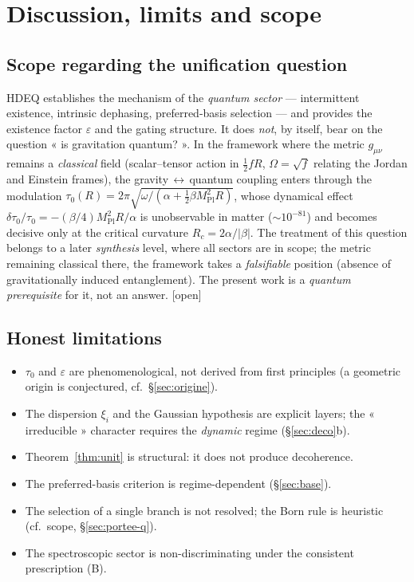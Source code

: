 \documentclass[11pt,a4paper]{article}
\newcommand{\statut}[1]{{\footnotesize\textsf{[#1]}}}
\theoremstyle{plain}
\theoremstyle{definition}
\theoremstyle{remark}
\begin{document}
\section{Discussion, limits and scope}
\subsection{Scope regarding the unification question}
HDEQ establishes the mechanism of the \emph{quantum sector} --- intermittent
existence, intrinsic dephasing, preferred-basis selection --- and provides the
existence factor $\varepsilon$ and the gating structure. It does \emph{not}, by
itself, bear on the question « is gravitation quantum? ». In the framework where
the metric $g_{\mu\nu}$ remains a \emph{classical} field (scalar--tensor action in
$\tfrac12 fR$, $\Omega=\sqrt f$ relating the Jordan and Einstein frames), the
gravity$\,\leftrightarrow\,$quantum coupling enters through the modulation
$\tau_0(R)=2\pi\sqrt{\omega/(\alpha+\tfrac12\beta M_{\mathrm{Pl}}^2 R)}$, whose
dynamical effect $\delta\tau_0/\tau_0=-(\beta/4)M_{\mathrm{Pl}}^2 R/\alpha$ is
unobservable in matter ($\sim10^{-81}$) and becomes decisive only at the critical
curvature $R_c=2\alpha/|\beta|$. The treatment of this question belongs to a later
\emph{synthesis} level, where all sectors are in scope; the metric remaining
classical there, the framework takes a \emph{falsifiable} position (absence of
gravitationally induced entanglement). The present work is a \emph{quantum
prerequisite} for it, not an answer. \statut{open}

\subsection{Honest limitations}
\begin{itemize}
\item $\tau_0$ and $\varepsilon$ are phenomenological, not derived from first principles (a geometric origin is conjectured, cf.\ \S\ref{sec:origine}).
\item The dispersion $\xi_i$ and the Gaussian hypothesis are explicit layers; the « irreducible » character requires the \emph{dynamic} regime (\S\ref{sec:deco}b).
\item Theorem~\ref{thm:unit} is structural: it does not produce decoherence.
\item The preferred-basis criterion is regime-dependent (\S\ref{sec:base}).
\item The selection of a single branch is not resolved; the Born rule is heuristic (cf.\ scope, \S\ref{sec:portee-q}).
\item The spectroscopic sector is non-discriminating under the consistent prescription (B).
\end{itemize}
\end{document}
